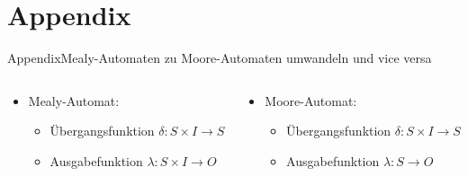 
\section{Appendix}

\setcounter{exercise}{1}

\begin{frame}{Appendix}{Mealy-Automaten zu Moore-Automaten umwandeln und vice versa}
  \begin{columns}
    \begin{column}{0.45\textwidth}
      \begin{itemize}
        \item \alert{Mealy-Automat:}
        \begin{itemize}
          \item \alert{Übergangsfunktion} $\delta: S \times I \rightarrow S$
          \item \alert{Ausgabefunktion} $\lambda: S \times I \rightarrow O$
        \end{itemize}
      \end{itemize}
    \end{column}
    \begin{column}{0.55\textwidth}
      \begin{itemize}
        \item \alert{Moore-Automat:}
        \begin{itemize}
          \item \alert{Übergangsfunktion} $\delta: S \times I \rightarrow S$
          \item \alert{Ausgabefunktion} $\lambda: S \rightarrow O$
        \end{itemize}
      \end{itemize}
    \end{column}
  \end{columns}
\end{frame}

